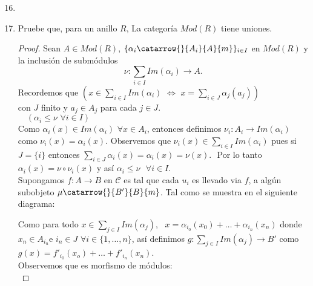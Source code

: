 \documentclass{article}
\begin{document}
	\begin{enumerate}[label=\textbf{Ej \arabic*.}]
	\setcounter{enumi}{15}
\item
\item Pruebe que, para un anillo $R$, La categoría $Mod(R)$ tiene uniones.\\
\begin{proof}
Sean $A\in Mod(R)$, $\{\alpha_i \catarrow{}{A_i}{A}{m}\}_{i\in I}$ en $Mod(R)$ y la inclusión de submódulos
\[
\nu\colon \displaystyle \sum_{i\in I}Im(\alpha_i)\longrightarrow A.
\]
Recordemos que $\left(x\in \displaystyle\sum_{i\in I}Im(\alpha_i)\,\,\iff\,\, x=\sum_{i\in J}\alpha_j(a_j)\right)$ \\
con $J$ finito y $a_j\in A_j$ para cada $j\in J$.\\

$\quad  (\alpha_i\leq \nu\,\,\forall i\in I)$\\

Como $\alpha_i(x)\in Im(\alpha_i)\,\,\forall x\in A_i$, entonces definimos $\nu_i : A_i\to Im(\alpha_i)$ como $\nu_i(x)=\alpha_i(x)$.
Observemos que $\nu_i(x)\in \displaystyle\sum_{i\in I}Im(\alpha_i)$ pues si $J=\{i\}$ entonces 
$\displaystyle\sum_{i\in J}\alpha_i(x)=\alpha_i(x)=\nu(x)$.\,\, Por lo tanto $\alpha_i(x)=\nu\circ\nu_i(x)$ y así $\alpha_i\leq \nu\,\,\,\,\forall i\in I$.\\

\quad  Supongamos $f:A\to B$ en $\mathscr{C}$ es tal que cada $u_i$ es llevado via $f$, a algún subobjeto $\mu\catarrow{}{B'}{B}{m}$. 
Tal como se muestra en el siguiente diagrama:





Como para todo $x\in \displaystyle\sum_{j\in I}Im(\alpha_j)$, \,\,\,$x=\alpha_{i_0}(x_0)+\ldots+\alpha_{i_n}(x_n)$ donde $x_n\in A_{i_n}$\quad e\quad
 $i_n\in J\,\, \forall i\in\{1,\ldots,n\}$, así definimos $g : \displaystyle\sum_{j\in I}Im(\alpha_j)\longrightarrow B'$ como 
$g(x)=f'_{i_0}(x_o)+\ldots+f'_{i_n}(x_n)$.\\
Observemos que es morfismo de módulos:\\


\end{proof}
\end{enumerate}
\end{document}

